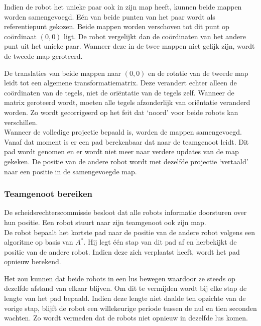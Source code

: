 \documentclass[eind]{penoverslag}
\begin{document}
Indien de robot het unieke paar ook in zijn map heeft, kunnen beide mappen worden samengevoegd. E\'en van beide punten van het paar wordt als referentiepunt gekozen. Beide mappen worden verschoven tot dit punt op co\"ordinaat $(0,0)$ ligt. De robot vergelijkt dan de co\"ordinaten van het andere punt uit het unieke paar. Wanneer deze in de twee mappen niet gelijk zijn, wordt de tweede map geroteerd.

De translaties van beide mappen naar $(0,0)$ en de rotatie van de tweede map leidt tot een algemene transformatiematrix. Deze verandert echter alleen de co\"ordinaten van de tegels, niet de ori\"entatie van de tegels zelf. Wanneer de matrix geroteerd wordt, moeten alle tegels afzonderlijk van ori\"entatie veranderd worden. Zo wordt gecorrigeerd op het feit dat `noord' voor beide robots kan verschillen.\\

Wanneer de volledige projectie bepaald is, worden de mappen samengevoegd. Vanaf dat moment is er een pad berekenbaar dat naar de teamgenoot leidt. Dit pad wordt genomen en er wordt niet meer naar verdere updates van de map gekeken. De positie van de andere robot wordt met dezelfde projectie `vertaald' naar een positie in de samengevoegde map.

\subsubsection{Teamgenoot bereiken}
\label{sssec:AlgoTeam}

De scheidsrechterscommissie besloot dat alle robots informatie doorsturen over hun positie. Een robot stuurt naar zijn teamgenoot ook zijn map.\\

De robot bepaalt het kortste pad naar de positie van de andere robot volgens een algoritme op basis van $A^{*}$. Hij legt \'e\'en stap van dit pad af en herbekijkt de positie van de andere robot. Indien deze zich verplaatst heeft, wordt het pad opnieuw berekend.

Het zou kunnen dat beide robots in een lus bewegen waardoor ze steeds op dezelfde afstand van elkaar blijven. Om dit te vermijden wordt bij elke stap de lengte van het pad bepaald. Indien deze lengte niet daalde ten opzichte van de vorige stap, blijft de robot een willekeurige periode tussen de nul en tien seconden wachten. Zo wordt vermeden dat de robots niet opnieuw in dezelfde lus komen.
\end{document}
